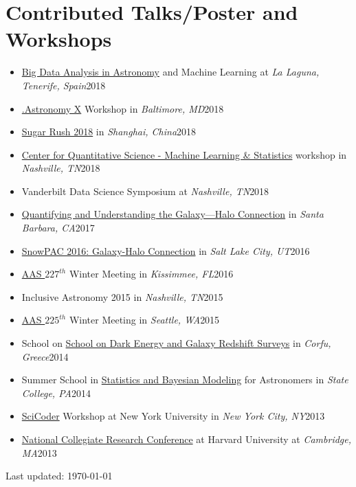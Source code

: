 \documentclass[letterpaper,11pt]{article}
\newcommand{\resumeSubheadingnew}[2]{
  \vspace{-2pt}\item{#1}\hfill{#2}\\[0pt]
  }
\newcommand{\resumeSubHeadingListStart}{\begin{itemize}[leftmargin=*]}
\newcommand{\resumeSubHeadingListEnd}{\end{itemize}}
\begin{document}
%
\section{Contributed Talks/Poster and Workshops}
  \resumeSubHeadingListStart
    \resumeSubheadingnew
      {\href{http://www.iac.es/winterschool/2018/}{Big Data Analysis in Astronomy} and Machine Learning at \textit{La Laguna, Tenerife, Spain}}{2018}
    \resumeSubheadingnew
      {\href{https://www.dotastronomy.com/home-ten/}{.Astronomy X} Workshop in \textit{Baltimore, MD}}{2018}
    \resumeSubheadingnew
      {\href{https://sugar-rush2018.github.io/}{Sugar Rush 2018} in \textit{Shanghai, China}}{2018}
    \resumeSubheadingnew
      {\href{https://www.vumc.org/cqs/cqs-summer-institute}{Center for Quantitative Science - Machine Learning \& Statistics} workshop in \textit{Nashville, TN}}{2018}
    \resumeSubheadingnew
      {Vanderbilt Data Science Symposium at \textit{Nashville, TN}}{2018}
    \resumeSubheadingnew
      {\href{https://www.kitp.ucsb.edu/activities/galhalo-c17}{Quantifying and Understanding the Galaxy—Halo Connection} in \textit{Santa Barbara, CA}}{2017}
    \resumeSubheadingnew
      {\href{http://www.physics.utah.edu/snowpac/archive/2016/}{SnowPAC 2016: Galaxy-Halo Connection} in \textit{Salt Lake City, UT}}{2016}
    \resumeSubheadingnew
      {\href{https://aas.org/meetings/aas227}{AAS $227^{th}$} Winter Meeting in \textit{Kissimmee, FL}}{2016}
    \resumeSubheadingnew
      {Inclusive Astronomy 2015 in \textit{Nashville, TN}}{2015}
    \resumeSubheadingnew
      {\href{https://aas.org/meetings/aas225}{AAS $225^{th}$} Winter Meeting in \textit{Seattle, WA}}{2015}
    \resumeSubheadingnew
      {School on \href{http://www.physics.ntua.gr/corfu2014/de.html}{School on Dark Energy and Galaxy Redshift Surveys} in \textit{Corfu, Greece}}{2014}
    \resumeSubheadingnew
      {Summer School in \href{http://astrostatistics.psu.edu/su14/}{Statistics and Bayesian Modeling} for Astronomers in \textit{State College, PA}}{2014}
    \resumeSubheadingnew
      {\href{http://scicoder.org/}{SciCoder} Workshop at New York University in \textit{New York City, NY}}{2013}
    \resumeSubheadingnew
      {\href{https://www.ncrc.hcura.org/}{National Collegiate Research Conference} at Harvard University at \textit{Cambridge, MA}}{2013}
  \resumeSubHeadingListEnd








%
\vspace{0.5cm}
\vfill{}
\begin{center}
{\scriptsize  Last updated: \today}
\end{center}

\end{document}
